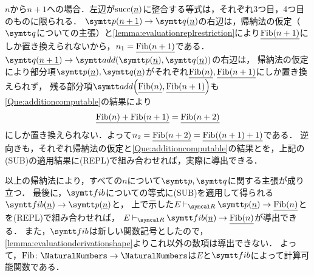 \(n\)から\(n + 1\)への場合．左辺が\(\apply{\succfunc}{\numeral{n}}\)に整合する等式は，それぞれ3つ目，4つ目のものに限られる．
\(\apply{\obj{p}}{\numeral{n+1}} \evaluate \apply{\obj{q}}{\numeral{n}}\)の右辺は，帰納法の仮定（\(\obj{q}\)についての主張）と\cref{lemma:evaluationreplrestriction}により\(\numeral{\apply{\Fib}{n+1}}\)にしか置き換えられないから，\(n_1 = \numeral{\apply{\Fib}{n+1}}\)である．
\(\apply{\obj{q}}{\numeral{n+1}} \evaluate \apply{\obj{add}}{\apply{\obj{p}}{\numeral{n}}, \apply{\obj{q}}{\numeral{n}}}\)の右辺は，
帰納法の仮定により部分項\(\apply{\obj{p}}{\numeral{n}}, \apply{\obj{q}}{\numeral{n}}\)がそれぞれ\(\numeral{\apply{\Fib}{n}}, \numeral{\apply{\Fib}{n+1}}\)にしか置き換えられず，
残る部分項\(\apply{\obj{add}}{\numeral{\apply{\Fib}{n}}, \numeral{\apply{\Fib}{n+1}}}\)も\cref{Que:additioncomputable}の結果により
\[
	\numeral{\apply{\Fib}{n} + \apply{\Fib}{n+1}} = \numeral{\apply{\Fib}{n + 2}}
\]
にしか置き換えられない．よって\(n_2 = \numeral{\apply{\Fib}{n+2}} = \numeral{\apply{\Fib}{(n+1)+1}}\)である．
逆向きも，それぞれ帰納法の仮定と\cref{Que:additioncomputable}の結果とを，上記の(SUB)の適用結果に(REPL)で組み合わせれば，実際に導出できる．

以上の帰納法により，すべての\(n\)について\(\obj{p}, \obj{q}\)に関する主張が成り立つ．
最後に，\(\obj{fib}\)についての等式に(SUB)を適用して得られる\(\apply{\obj{fib}}{\numeral{n}} \evaluate \apply{\obj{p}}{\numeral{n}}\)と，
上で示した\(E \evaluatable \apply{\obj{p}}{\numeral{n}} \evaluate \numeral{\apply{\Fib}{n}}\)とを(REPL)で組み合わせれば，
\(E \evaluatable \apply{\obj{fib}}{\numeral{n}} \evaluate \numeral{\apply{\Fib}{n}}\)が導出できる．
また，\(\obj{fib}\)は新しい関数記号としたので，\cref{lemma:evaluationderivationshape}よりこれ以外の数項は導出できない．
よって，\(\Fib \colon \NaturalNumbers \to \NaturalNumbers\)は\(E\)と\(\obj{fib}\)によって計算可能関数である．

\section*{}

\subsection*{}

